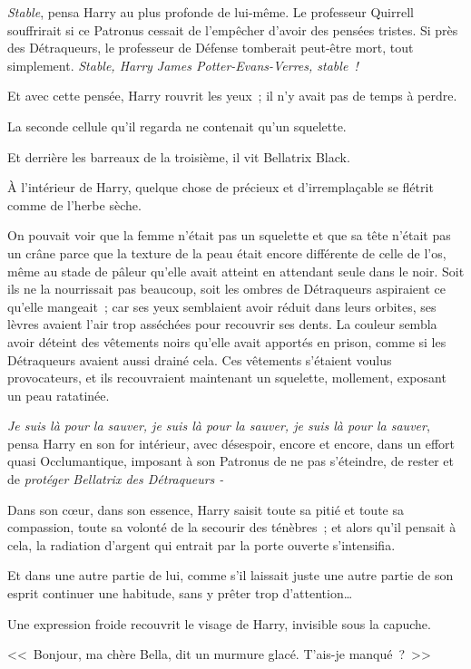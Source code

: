 \emph{Stable}, pensa Harry au plus profonde de lui-même. Le professeur Quirrell souffrirait si ce Patronus cessait de l'empêcher d'avoir des pensées tristes. Si près des Détraqueurs, le professeur de Défense tomberait peut-être mort, tout simplement. \emph{Stable, Harry James Potter-Evans-Verres, stable~!}

Et avec cette pensée, Harry rouvrit les yeux~; il n'y avait pas de temps à perdre.

La seconde cellule qu'il regarda ne contenait qu'un squelette.

Et derrière les barreaux de la troisième, il vit Bellatrix Black.

À l'intérieur de Harry, quelque chose de précieux et d'irremplaçable se flétrit comme de l'herbe sèche.

On pouvait voir que la femme n'était pas un squelette et que sa tête n'était pas un crâne parce que la texture de la peau était encore différente de celle de l'os, même au stade de pâleur qu'elle avait atteint en attendant seule dans le noir. Soit ils ne la nourrissait pas beaucoup, soit les ombres de Détraqueurs aspiraient ce qu'elle mangeait~; car ses yeux semblaient avoir réduit dans leurs orbites, ses lèvres avaient l'air trop asséchées pour recouvrir ses dents. La couleur sembla avoir déteint des vêtements noirs qu'elle avait apportés en prison, comme si les Détraqueurs avaient aussi drainé cela. Ces vêtements s'étaient voulus provocateurs, et ils recouvraient maintenant un squelette, mollement, exposant un peau ratatinée.

\emph{Je suis là pour la sauver, je suis là pour la sauver, je suis là pour la sauver}, pensa Harry en son for intérieur, avec désespoir, encore et encore, dans un effort quasi Occlumantique, imposant à son Patronus de ne pas s'éteindre, de rester et de \emph{protéger Bellatrix des Détraqueurs -}

Dans son cœur, dans son essence, Harry saisit toute sa pitié et toute sa compassion, toute sa volonté de la secourir des ténèbres~; et alors qu'il pensait à cela, la radiation d'argent qui entrait par la porte ouverte s'intensifia.

Et dans une autre partie de lui, comme s'il laissait juste une autre partie de son esprit continuer une habitude, sans y prêter trop d'attention…

Une expression froide recouvrit le visage de Harry, invisible sous la capuche.

<<~Bonjour, ma chère Bella, dit un murmure glacé. T'ais-je manqué~?~>> 

